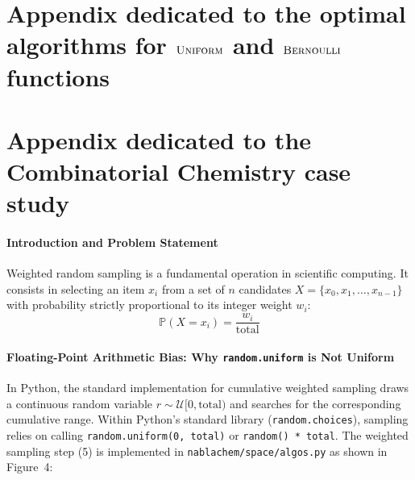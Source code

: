 
\section{Appendix dedicated to the optimal algorithms for $\textsc{Uniform}$ and $\textsc{Bernoulli}$ functions}
\label{app:lumbroso}






\section{Appendix dedicated to the Combinatorial Chemistry case study}
\label{app:chemistry}

\paragraph{Introduction and Problem Statement}
Weighted random sampling is a fundamental operation in scientific computing. It consists in selecting an item $x_i$ from a set of $n$ candidates $X = \{x_0, x_1, \dots, x_{n-1}\}$ with probability strictly proportional to its integer weight $w_i$:
\begin{equation}
\mathbb{P}(X = x_i) = \frac{w_i}{\text{total}}
\end{equation}



\paragraph{Floating-Point Arithmetic Bias: Why \texttt{random.uniform} is Not Uniform}
In Python, the standard implementation for cumulative weighted sampling draws a continuous random variable $r \sim \mathcal{U}[0, \text{total})$ and searches for the corresponding cumulative range. Within Python's standard library (\texttt{random.choices}), sampling relies on calling \texttt{random.uniform(0, total)} or \texttt{random() * total}. The weighted sampling step (5) is implemented in \texttt{nablachem/space/algos.py} as shown in Figure~4:

